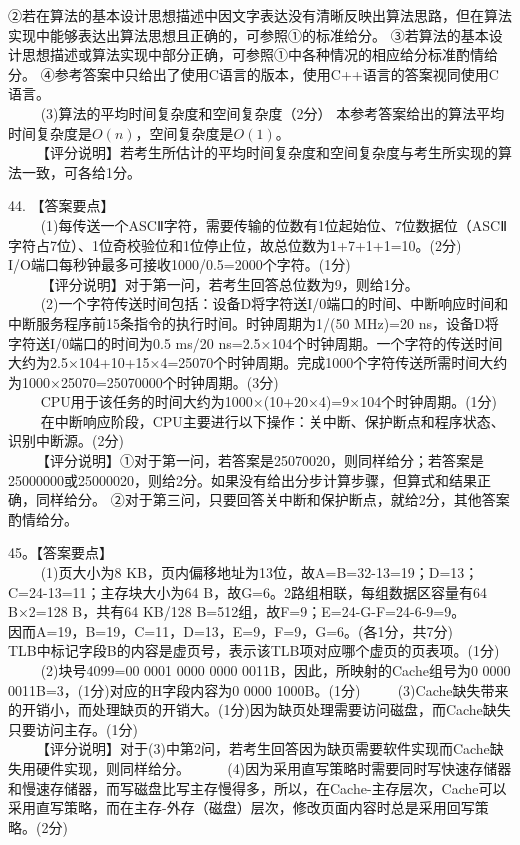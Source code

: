 ②若在算法的基本设计思想描述中因文字表达没有清晰反映出算法思路，但在算法实现中能够表达出算法思想且正确的，可参照①的标准给分。
③若算法的基本设计思想描述或算法实现中部分正确，可参照①中各种情况的相应给分标准酌情给分。
④参考答案中只给出了使用C语言的版本，使用C++语言的答案视同使用C语言。 \\
$\qquad$ (3)算法的平均时间复杂度和空间复杂度（2分）
本参考答案给出的算法平均时间复杂度是$O(n)$，空间复杂度是$O(1)$。 \\
$\qquad$【评分说明】若考生所估计的平均时间复杂度和空间复杂度与考生所实现的算法一致，可各给1分。

44. 【答案要点】 \\
$\qquad$ (1)每传送一个ASCⅡ字符，需要传输的位数有1位起始位、7位数据位（ASCⅡ字符占7位）、1位奇校验位和1位停止位，故总位数为1+7+1+1=10。(2分) \\
I/O端口每秒钟最多可接收1000/0.5=2000个字符。(1分) \\
$\qquad$ 【评分说明】对于第一问，若考生回答总位数为9，则给1分。 \\
$\qquad$ (2)一个字符传送时间包括：设备D将字符送I/0端口的时间、中断响应时间和中断服务程序前15条指令的执行时间。时钟周期为1/(50 MHz)=20 ns，设备D将字符送I/0端口的时间为0.5 ms/20 ns=2.5×104个时钟周期。一个字符的传送时间大约为2.5×104+10+15×4=25070个时钟周期。完成1000个字符传送所需时间大约为1000×25070=25070000个时钟周期。(3分) \\
$\qquad$ CPU用于该任务的时间大约为1000×(10+20×4)=9×104个时钟周期。(1分) \\
$\qquad$ 在中断响应阶段，CPU主要进行以下操作：关中断、保护断点和程序状态、识别中断源。(2分) \\
$\qquad$【评分说明】①对于第一问，若答案是25070020，则同样给分；若答案是25000000或25000020，则给2分。如果没有给出分步计算步骤，但算式和结果正确，同样给分。 
②对于第三问，只要回答关中断和保护断点，就给2分，其他答案酌情给分。

45。【答案要点】 \\
$\qquad$ (1)页大小为8 KB，页内偏移地址为13位，故A=B=32-13=19；D=13；C=24-13=11；主存块大小为64 B，故G=6。2路组相联，每组数据区容量有64 B×2=128 B，共有64 KB/128 B=512组，故F=9；E=24-G-F=24-6-9=9。 \\
因而A=19，B=19，C=11，D=13，E=9，F=9，G=6。(各1分，共7分) \\
TLB中标记字段B的内容是虚页号，表示该TLB项对应哪个虚页的页表项。(1分) \\
$\qquad$ (2)块号4099=00 0001 0000 0000 0011B，因此，所映射的Cache组号为0 0000 0011B=3，(1分)对应的H字段内容为0 0000 1000B。(1分)
$\qquad$ (3)Cache缺失带来的开销小，而处理缺页的开销大。(1分)因为缺页处理需要访问磁盘，而Cache缺失只要访问主存。(1分) \\
$\qquad$【评分说明】对于(3)中第2问，若考生回答因为缺页需要软件实现而Cache缺失用硬件实现，则同样给分。
$\qquad$ (4)因为采用直写策略时需要同时写快速存储器和慢速存储器，而写磁盘比写主存慢得多，所以，在Cache-主存层次，Cache可以采用直写策略，而在主存-外存（磁盘）层次，修改页面内容时总是采用回写策略。(2分)

